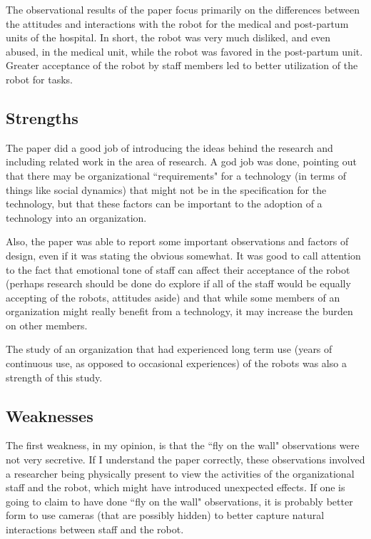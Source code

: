 \documentclass{article}
\begin{document}
The observational results of the paper focus primarily on the differences between the attitudes and interactions with the robot for the medical and post-partum units of the hospital. In short, the robot was very much disliked, and even abused, in the medical unit, while the robot was favored in the post-partum unit. Greater acceptance of the robot by staff members led to better utilization of the robot for tasks. 

\subsection{Strengths}

The paper did a good job of introducing the ideas behind the research and including related work in the area of research. A god job was done, pointing out that there may be organizational ``requirements" for a technology (in terms of things like social dynamics) that might not be in the specification for the technology, but that these factors can be important to the adoption of a technology into an organization.

Also, the paper was able to report some important observations and factors of design, even if it was stating the obvious somewhat. It was good to call attention to the fact that emotional tone of staff can affect their acceptance of the robot (perhaps research should be done do explore if all of the staff would be equally accepting of the robots, attitudes aside) and that while some members of an organization might really benefit from a technology, it may increase the burden on other members.

The study of an organization that had experienced long term use (years of continuous use, as opposed to occasional experiences) of the robots was also a strength of this study.

\subsection{Weaknesses}

The first weakness, in my opinion, is that the ``fly on the wall" observations were not very secretive. If I understand the paper correctly, these observations involved a researcher being physically present to view the activities of the organizational staff and the robot, which might have introduced unexpected effects. If one is going to claim to have done ``fly on the wall" observations, it is probably better form to use cameras (that are possibly hidden) to better capture natural interactions between staff and the robot.
\end{document}

